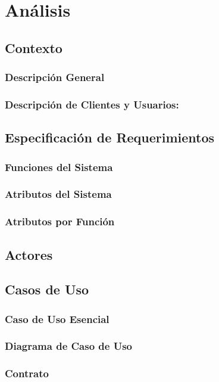 \section{Análisis}

\subsection{Contexto}
\subsubsection{Descripción General}
\subsubsection{Descripción de Clientes y Usuarios:}

\subsection{Especificación de Requerimientos}
\subsubsection{Funciones del Sistema}
\subsubsection{Atributos del Sistema}
\subsubsection{Atributos por Función}

\newpage
\subsection{Actores}

\subsection{Casos de Uso}
\subsubsection{Caso de Uso Esencial}
\subsubsection{Diagrama de Caso de Uso}
\subsubsection{Contrato}

